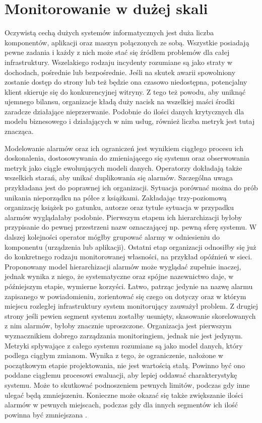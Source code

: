 \section{Monitorowanie w dużej skali}
\label{chapters:monitoring:at_scale}

Oczywistą cechą dużych systemów informatycznych jest duża liczba komponentów, aplikacji oraz maszyn połączonych ze sobą.
Wszystkie posiadają pewne zadania i każdy z nich może stać się źródłem problemów dla całej infrastruktury. 
Wszelakiego rodzaju incydenty rozumiane są jako straty w dochodach, pośrednie lub bezpośrednie. Jeśli na skutek 
awarii spowolniony zostanie dostęp do strony lub też będzie ona czasowo niedostępna, potencjalny klient
skieruje się do konkurencyjnej witryny. Z tego też powodu, aby uniknąć ujemnego bilansu, organizacje kładą duży nacisk
na wszelkiej maści środki zaradcze działające nieprzerwanie. Podobnie do ilości danych krytycznych dla modelu 
biznesowego i działających w nim usług, również liczba metryk jest tutaj znacząca.

Modelowanie alarmów oraz ich ograniczeń jest wynikiem ciągłego procesu ich doskonalenia, dostosowywania do zmieniającego
się systemu oraz obserwowania metryk jako ciągle ewoluujących modeli danych.
Operatorzy dokładają także wszelkich starań, aby unikać duplikowania się alarmów. Szczególna uwaga
przykładana jest do poprawnej ich organizacji. Sytuacja porównać można do prób unikania nieporządku na półce z książkami.
Zakładając trzy-poziomową organizację książek po gatunku, autorze oraz tytule sytuacja w przypadku alarmów wyglądałaby podobnie.
Pierwszym etapem ich hierarchizacji byłoby przypisanie do pewnej przestrzeni nazw oznaczającej np.
pewną sferę systemu. W dalszej kolejności operator mógłby grupować alarmy w odniesieniu do komponentu (urządzenia lub aplikacji).
Ostatni etap organizacji odnosiłby się już do konkretnego rodzaju monitorowanej własności, na przykład opóźnień w sieci.
Proponowany model hierarchizacji alarmów może wyglądać zupełnie inaczej, jednak wynika z niego, że systematyczne oraz spójne
nazewnictwo daje, w późniejszym etapie, wymierne korzyści. Łatwo, patrząc jedynie na nazwę alarmu zapisanego w powiadomieniu, zorientować się
czego on dotyczy oraz w którym miejscu rozległej infrastruktury system monitorujący zauważył problem. Z drugiej strony jeśli
pewien segment systemu zostałby usunięty, skasowanie skorelowanych z nim alarmów, byłoby znacznie uproszczone.
Organizacja jest pierwszym wyznacznikiem dobrego zarządzania monitoringiem, jednak nie jest jedynym. Metryki spływające
z całego systemu rozumiane są jako model danych, który podlega ciągłym zmianom. Wynika z tego, że ograniczenie, nałożone w początkowym
etapie projektowania, nie jest wartością stałą. Powinno być ono poddane ciągłemu procesowi ewaluacji, aby lepiej 
oddawać charakterystykę systemu. Może to skutkować podnoszeniem pewnych limitów, podczas gdy inne ulegać będą zmniejszeniu. Konieczne 
może okazać się także zwiększanie ilości alarmów w pewnych miejscach, podczas gdy dla innych 
segmentów ich ilość powinna być zmniejszana \cite{monitoring_and_alerting}.